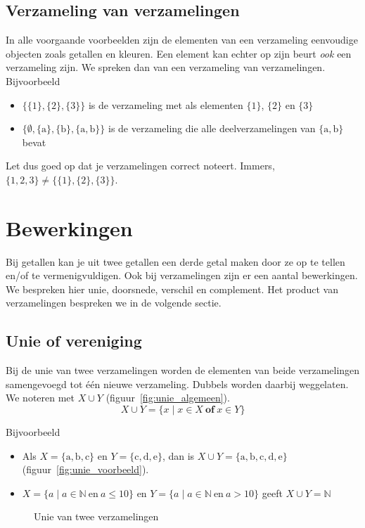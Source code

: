 \subsection{Verzameling van verzamelingen}
In alle voorgaande voorbeelden zijn de elementen van een verzameling eenvoudige objecten zoals getallen en kleuren. Een element kan echter op zijn beurt \emph{ook} een verzameling zijn. We spreken dan van een verzameling van verzamelingen. Bijvoorbeeld
\begin{itemize}
\item $\{\{1\},\{2\},\{3\} \}$ is de verzameling met als elementen $\{1\}$, $\{2\}$ en $\{3\}$
\item $\{ \emptyset, \{\mathrm{a}\}, \{\mathrm{b}\}, \{\mathrm{a},\mathrm{b}\}\}$ is de verzameling die alle deelverzamelingen van $\{ \mathrm{a},\mathrm{b}\}$ bevat

\end{itemize}
Let dus goed op dat je verzamelingen correct noteert. 
Immers,\\ $\{1,2,3 \}\not = \{\{ 1\},\{2 \},\{3 \} \}$.



\newpage
\section{Bewerkingen}
Bij getallen kan je  uit twee getallen een derde getal maken door ze  op te tellen en/of te  vermenigvuldigen. Ook bij verzamelingen zijn er een aantal bewerkingen. We bespreken hier unie, doorsnede, verschil en complement. Het product van verzamelingen bespreken we in de volgende sectie.

\subsection{Unie of vereniging}
Bij de unie van twee verzamelingen worden de elementen van beide verzamelingen samengevoegd tot \'e\'en nieuwe verzameling. Dubbels worden daarbij weggelaten. We noteren met $X\cup Y$ (figuur~\ref{fig:unie_algemeen}). 
\begin{equation*}
X\cup Y =\{x \mid x\in X ~\mathbf{of}~x\in Y \}
\end{equation*}

Bijvoorbeeld
\begin{itemize}
\item Als $X=\{\mathrm{a},\mathrm{b},\mathrm{c}\}$ en $Y=\{\mathrm{c},\mathrm{d},\mathrm{e}\}$, dan is $X\cup Y=\{\mathrm{a},\mathrm{b},\mathrm{c},\mathrm{d},\mathrm{e}\}$ (figuur~\ref{fig:unie_voorbeeld}).
\item $X=\{a \mid a\in \mathbb{N} ~\mathrm{en}~a\leqslant 10\}$ en $Y=\{a \mid a\in \mathbb{N} ~\mathrm{en}~a>10\}$ geeft $X\cup Y=\mathbb{N}$
\end{itemize}
\begin{figure}[htbp]
\centering
{}\qquad
{}
\caption{Unie van twee verzamelingen}
\end{figure}


